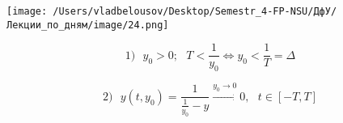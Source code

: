 \documentclass[12pt, a4paper]{report}
\begin{document}
\begin{center}
    \texttt{[image: /Users/vladbelousov/Desktop/Semestr\_4-FP-NSU/ДфУ/Лекции\_по\_дням/image/24.png]}
\end{center} 
\[ 1) \text{ } y_0 > 0 ;\text{ }  T < \frac{1}{y_0 } \Leftrightarrow y_0 < \frac{1}{T } =\Delta  \] 

\[ 2) \text{ } y(t,y_0 )= \frac{1}{\frac{1}{y_0 } - y    } \xrightarrow{y_0 \to  0 } 0 , \text{  }  t \in [-T,T]    \] 


\ifdefined\mainfile
\else
    
\end{document}
